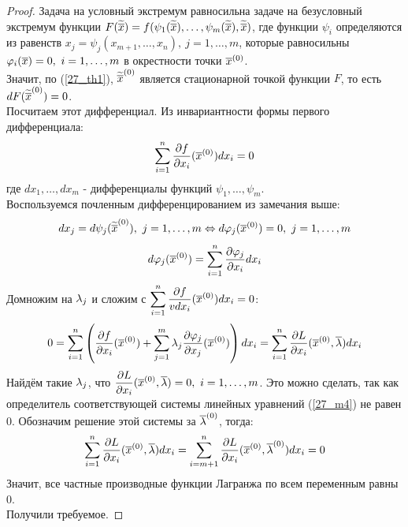 \begin{proof}
	Задача на условный экстремум равносильна задаче на безусловный экстремум функции $F(\widetilde{\overline x})=f(\psi_1(\widetilde{\overline x}),\dots,\psi_m({\widetilde{\overline x}}),{\widetilde{\overline x}})$, где функции $\psi_i$ определяются из равенств $x_j=\psi_j(x_{m+1},\dots,x_n),\ j=1,\dots,m$, которые равносильны $\phi_i(\vx)=0,\ i=1,\dots,m$ в окрестности точки $\overline x^{({0})}$.\\
	Значит, по (\ref{27_th1}), ${\widetilde{\overline x}}^{({0})}$ является стационарной точкой функции $F$, то есть $dF({\widetilde{\overline x}}^{({0})})=0$.\\
	Посчитаем этот дифференциал. Из инвариантности формы первого дифференциала:
	\begin{equation}\label{28_eq2}
		\sum_{i=1}^n\frac{\vd f}{\vd x_i}(\vx\n)dx_i=0
	\end{equation}
	где $dx_1,\dots,dx_m$ - дифференциалы функций $\psi_1,\dots,\psi_m$.\\
	Воспользуемся почленным дифференцированием из замечания выше:
	\[dx_j=d\psi_j({\widetilde{\overline x}}^{({0})}),\ j=1,\dots,m\Leftrightarrow d\varphi_j(\overline x^{({0})})=0,\ j=1,\dots,m\]
	\[d\phi_j(\vx\n)=\sum_{i=1}^n\frac{\vd \phi_j}{\vd x_i}dx_i\]
	Домножим на $\lambda_j$ и сложим с $\ds\sum_{i=1}^n\frac{\vd f}{vd x_i}(\vx\n)dx_i=0$:
	\[0=\sum_{i=1}^n\l(\frac{\vd f}{\vd x_i}(\vx\n)+\sum_{j=1}^m\la_j\frac{\vd \phi_j}{\vd x_j}(\vx\n)\r)dx_i=\sum_{i=1}^n\frac{\vd L}{\vd x_i}(\vx\n,\v\la)dx_i\]
	Найдём такие $\lambda_j$, что $\ds\frac{\vd L}{\vd x_i}(\vx\n,\v\la)=0,\ i=1,\dots,m$. Это можно сделать, так как определитель соответствующей системы линейных уравнений (\ref{27_m4}) не равен 0. Обозначим решение этой системы за $\overline{\lambda}^{({0})}$, тогда:
	\[\sum_{i=1}^n\frac{\vd L}{\vd x_i}(\vx\n,\v\la)dx_i=\sum_{i=m+1}^n\frac{\vd L}{\vd x_i}(\vx\n,\v\la\n)dx_i=0\]
	Значит, все частные производные функции Лагранжа по всем переменным равны 0. \\
	Получили требуемое.
\end{proof}